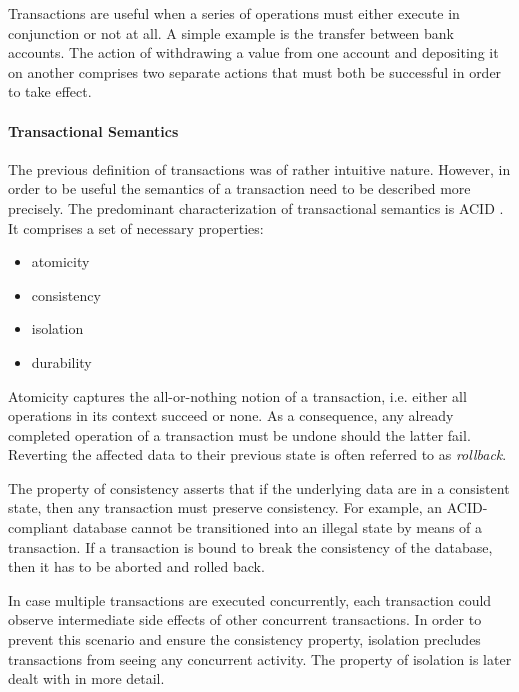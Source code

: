 Transactions are useful when a series of operations must either execute in
conjunction or not at all. A simple example is the transfer between bank
accounts. The action of withdrawing a value from one account and depositing it
on another comprises two separate actions that must both be successful in order
to take effect.


\paragraph{Transactional Semantics}

The previous definition of transactions was of rather intuitive nature. However,
in order to be useful the semantics of a transaction need to be described more
precisely. The predominant characterization of transactional semantics is ACID
\cite{gray1981transaction, haerder1983principles}. It comprises a set of necessary properties:

\begin{itemize}
    \item atomicity
    \item consistency
    \item isolation
    \item durability
\end{itemize}

Atomicity captures the all-or-nothing notion of a transaction, i.e. either all
operations in its context succeed or none. As a consequence, any already
completed operation of a transaction must be undone should the latter fail.
Reverting the affected data to their previous state is often referred to as
\emph{rollback}.

The property of consistency asserts that if the underlying data are in a
consistent state, then any transaction must preserve consistency. For example,
an ACID-compliant database cannot be transitioned into an illegal state by means
of a transaction. If  a transaction is bound to break the consistency of the
database, then it has to be aborted and rolled back.

In case multiple transactions are executed concurrently, each transaction could
observe intermediate side effects of other concurrent transactions. In order to
prevent this scenario and ensure the consistency property, isolation precludes
transactions from seeing any concurrent activity. The property of isolation is
later dealt with in more detail.

